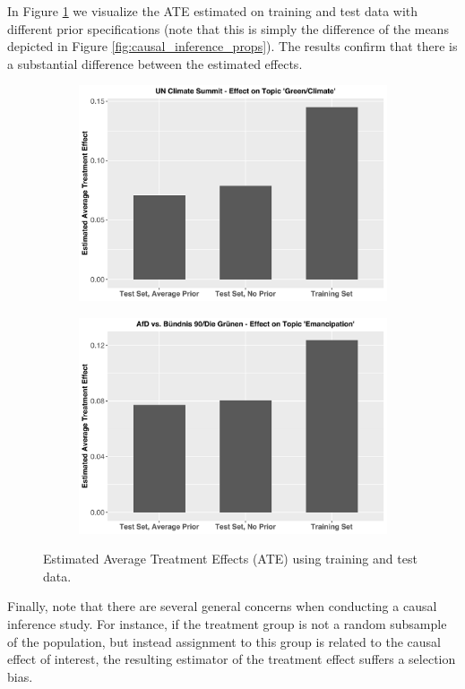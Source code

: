 In Figure \ref{fig:causal_inference_ate} we visualize the ATE estimated on training and test data with different prior specifications (note that this is simply the difference of the means depicted in Figure \ref{fig:causal_inference_props}). The results confirm that there is a substantial difference between the estimated effects.

\begin{figure}[h!]
  \centering
  \captionsetup{justification=centering,margin=2cm}
  \begin{subfigure}[b]{0.49\linewidth}
    \includegraphics[width=\linewidth]{../plots/6_2/climate_summit_ate.pdf}
  \end{subfigure}
  \begin{subfigure}[b]{0.49\linewidth}
    \includegraphics[width=\linewidth]{../plots/6_2/emancipation_ate.pdf}
  \end{subfigure}
  \caption{Estimated Average Treatment Effects (ATE) using training and test data.}
  \label{fig:causal_inference_ate}
\end{figure}

Finally, note that there are several general concerns when conducting a causal inference study. For instance, if the treatment group is not a random subsample of the population, but instead assignment to this group is related to the causal effect of interest, the resulting estimator of the treatment effect suffers a selection bias.